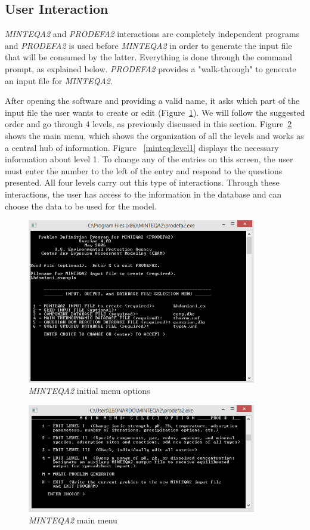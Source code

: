 \subsection{User Interaction}\label{minteq:interactions}
\emph{MINTEQA2} and \emph{PRODEFA2} interactions are completely independent programs and \emph{PRODEFA2} is used before \emph{MINTEQA2} in order to generate the input file that will be consumed by the latter. Everything is done through the command prompt, as explained below. \emph{PRODEFA2} provides a "walk-through" to generate an input file for \emph{MINTEQA2}.

After opening the software and providing a valid name, it asks which part of the input file the user wants to create or edit (Figure~\ref{minteq:init}). We will follow the suggested order and go through 4 levels, as previously discussed in this section. Figure~\ref{minteq:level0} shows the main menu, which shows the organization of all the levels and works as a central hub of information. Figure ~\ref{minteq:level1} displays the necessary information about level 1. To change any of the entries on this screen, the user must enter the number to the left of the entry and respond to the questions presented. All four levels carry out this type of interactions. Through these interactions, the user has access to the information in the database and can choose the data to be used for the model.

\begin{figure}[ht!]
\centering
\includegraphics[width=100mm]{figures/minteq-init.png}
\caption{\emph{MINTEQA2} initial menu options}
\label{minteq:init}
\end{figure}

\begin{figure}[ht!]
\centering
\includegraphics[width=100mm]{figures/minteq-level0.png}
\caption{\emph{MINTEQA2} main menu}
\label{minteq:level0}
\end{figure}

